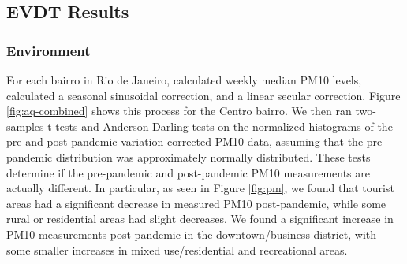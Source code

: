 \subsection{EVDT Results} \label{sec:vida-evdt-result}

\subsubsection{Environment} \label{sec:vida-evdt-e-result}

For each bairro in Rio de Janeiro, calculated weekly median PM10 levels, calculated a seasonal sinusoidal correction, and a linear secular correction. Figure \ref{fig:aq-combined} shows this process for the Centro bairro. We then ran two-samples t-tests and Anderson Darling tests on the normalized histograms of the pre-and-post pandemic variation-corrected PM10 data, assuming that the pre-pandemic distribution was approximately normally distributed. These tests determine if the pre-pandemic and post-pandemic PM10 measurements are actually different. In particular, as seen in Figure \ref{fig:pm}, we found that tourist areas had a significant decrease in measured PM10 post-pandemic, while some rural or residential areas had slight decreases. We found a significant increase in PM10 measurements post-pandemic in the downtown/business district, with some smaller increases in mixed use/residential and recreational areas. 

\clearpage

